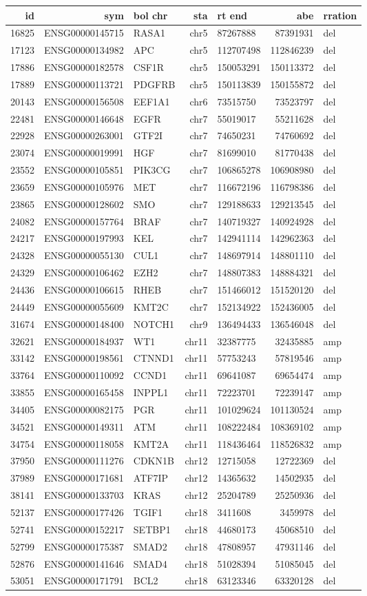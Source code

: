 \documentclass[]{article}
\begin{document}
\begin{longtable}[]{@{}rrlrlrl@{}}
\toprule
id & sym & bol chr & sta & rt end & abe & rration\tabularnewline
\midrule
\endhead
16825 & ENSG00000145715 & RASA1 & chr5 & 87267888 & 87391931 &
del\tabularnewline
17123 & ENSG00000134982 & APC & chr5 & 112707498 & 112846239 &
del\tabularnewline
17886 & ENSG00000182578 & CSF1R & chr5 & 150053291 & 150113372 &
del\tabularnewline
17889 & ENSG00000113721 & PDGFRB & chr5 & 150113839 & 150155872 &
del\tabularnewline
20143 & ENSG00000156508 & EEF1A1 & chr6 & 73515750 & 73523797 &
del\tabularnewline
22481 & ENSG00000146648 & EGFR & chr7 & 55019017 & 55211628 &
del\tabularnewline
22928 & ENSG00000263001 & GTF2I & chr7 & 74650231 & 74760692 &
del\tabularnewline
23074 & ENSG00000019991 & HGF & chr7 & 81699010 & 81770438 &
del\tabularnewline
23552 & ENSG00000105851 & PIK3CG & chr7 & 106865278 & 106908980 &
del\tabularnewline
23659 & ENSG00000105976 & MET & chr7 & 116672196 & 116798386 &
del\tabularnewline
23865 & ENSG00000128602 & SMO & chr7 & 129188633 & 129213545 &
del\tabularnewline
24082 & ENSG00000157764 & BRAF & chr7 & 140719327 & 140924928 &
del\tabularnewline
24217 & ENSG00000197993 & KEL & chr7 & 142941114 & 142962363 &
del\tabularnewline
24328 & ENSG00000055130 & CUL1 & chr7 & 148697914 & 148801110 &
del\tabularnewline
24329 & ENSG00000106462 & EZH2 & chr7 & 148807383 & 148884321 &
del\tabularnewline
24436 & ENSG00000106615 & RHEB & chr7 & 151466012 & 151520120 &
del\tabularnewline
24449 & ENSG00000055609 & KMT2C & chr7 & 152134922 & 152436005 &
del\tabularnewline
31674 & ENSG00000148400 & NOTCH1 & chr9 & 136494433 & 136546048 &
del\tabularnewline
32621 & ENSG00000184937 & WT1 & chr11 & 32387775 & 32435885 &
amp\tabularnewline
33142 & ENSG00000198561 & CTNND1 & chr11 & 57753243 & 57819546 &
amp\tabularnewline
33764 & ENSG00000110092 & CCND1 & chr11 & 69641087 & 69654474 &
amp\tabularnewline
33855 & ENSG00000165458 & INPPL1 & chr11 & 72223701 & 72239147 &
amp\tabularnewline
34405 & ENSG00000082175 & PGR & chr11 & 101029624 & 101130524 &
amp\tabularnewline
34521 & ENSG00000149311 & ATM & chr11 & 108222484 & 108369102 &
amp\tabularnewline
34754 & ENSG00000118058 & KMT2A & chr11 & 118436464 & 118526832 &
amp\tabularnewline
37950 & ENSG00000111276 & CDKN1B & chr12 & 12715058 & 12722369 &
del\tabularnewline
37989 & ENSG00000171681 & ATF7IP & chr12 & 14365632 & 14502935 &
del\tabularnewline
38141 & ENSG00000133703 & KRAS & chr12 & 25204789 & 25250936 &
del\tabularnewline
52137 & ENSG00000177426 & TGIF1 & chr18 & 3411608 & 3459978 &
del\tabularnewline
52741 & ENSG00000152217 & SETBP1 & chr18 & 44680173 & 45068510 &
del\tabularnewline
52799 & ENSG00000175387 & SMAD2 & chr18 & 47808957 & 47931146 &
del\tabularnewline
52876 & ENSG00000141646 & SMAD4 & chr18 & 51028394 & 51085045 &
del\tabularnewline
53051 & ENSG00000171791 & BCL2 & chr18 & 63123346 & 63320128 &
del\tabularnewline
\bottomrule
\end{longtable}
\end{document}

